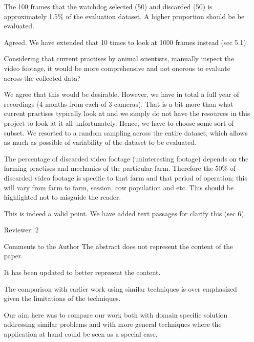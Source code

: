\documentclass[10pt,a4paper]{letter}
\begin{document}
\begin{letter}{}
\begin{siderules}
The 100 frames that the watchdog selected (50) and discarded (50) is approximately 1.5\% of the evaluation dataset. 
A higher proportion should be be evaluated. 
\end{siderules}

Agreed. We have extended that 10 times to look at 1000 frames instead (sec 5.1).

\begin{siderules}
Considering that current practises by animal scientists, manually inspect the video footage, it would be more 
comprehensive and not onerous to evaluate across the collected data?
\end{siderules}

We agree that this would be desirable. However, we have in total a full year of recordings (4 months from each of 3 cameras). 
That is a bit more than what current practises typically look at and
we simply do not have the resources in this project to look at it all unfortunately. 
Hence, we have to choose some sort of subset. We resorted to a random sampling across the
entire dataset, which allows as much as possible of variability of the dataset to be evaluated.

\begin{siderules}
The percentage of discarded video footage (uninteresting footage) depends on the farming practises and mechanics of the particular farm. Therefore the 50\% of discarded video footage is specific to that farm and that period of operation; this will vary from farm to farm, session, cow population and etc. This should be highlighted not to misguide the reader.
\end{siderules}

This is indeed a valid point. We have added text passages for clarify this (sec 6).

\begin{siderules}
Reviewer: 2

Comments to the Author
The abstract does not represent the content of the paper.
\end{siderules}

It has been updated to better represent the content.

\begin{siderules}
The comparison with earlier work using similar techniques is over emphasized given the limitations
of the techniques.
\end{siderules}

Our aim here was to compare our work both with domain specific solution addressing similar problems and with more general techniques where the application at hand could be seen as a special case.


\end{letter}
\end{document}
